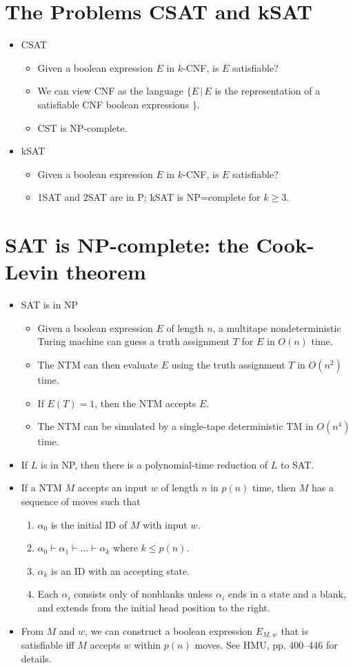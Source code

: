\documentclass[]{article}
\begin{document}
\section{The Problems CSAT and kSAT}
\begin{itemize}
\item CSAT
\begin{itemize}
\item Given a boolean expression $E$ in $k$-CNF, is $E$ satisfiable?
\item We can view CNF as the language $\{ E\,|\,E$ is the representation of a
satisfiable CNF boolean expressions $\}$.
\item CST is NP-complete.
\end{itemize}
\item kSAT
\begin{itemize}
\item Given a boolean expression $E$ in $k$-CNF, is $E$ satisfiable?
\item 1SAT and 2SAT are in P; kSAT is NP=complete for $k \geq 3$.
\end{itemize}
\end{itemize}

\section{SAT is NP-complete: the Cook-Levin theorem}
\begin{itemize}
\item SAT is in NP
\begin{itemize}
\item Given a boolean expression $E$ of length $n$, a multitape nondeterministic
Turing machine can guess a truth assignment $T$ for $E$ in $O(n)$ time.
\item The NTM can then evaluate $E$ using the truth assignment $T$ in $O(n^2)$
time.
\item If $E(T) = 1$, then the NTM accepts $E$.
\item The NTM can be simulated by a single-tape deterministic TM in $O(n^4)$
time.
\end{itemize}
\item If $L$ is in NP, then there is a polynomial-time reduction of $L$ to SAT.
\item If a NTM $M$ accepts an input $w$ of length $n$ in $p(n)$ time, then $M$
has a sequence of moves such that
\begin{enumerate}
\item $\alpha_0$ is the initial ID of $M$ with input $w$.
\item $\alpha_0 \vdash \alpha_1 \vdash \ldots \vdash \alpha_k$ where $k \leq
p(n)$.
\item $\alpha_k$ is an ID with an accepting state.
\item Each $\alpha_i$ consists only of nonblanks unless $\alpha_i$ ends in a
state and a blank, and extends from the initial head position to the right.
\end{enumerate}
\item From $M$ and $w$, we can construct a boolean expression $E_{M,w}$ that is
satisfiable iff $M$ accepts $w$ within $p(n)$ moves. See HMU, pp. 400--446 for
details.
\end{itemize}
\end{document}
